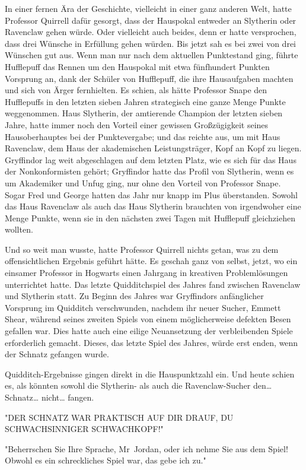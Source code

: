 {In einer fernen Ära der Geschichte, vielleicht in einer ganz anderen Welt, hatte Professor Quirrell dafür gesorgt, dass der Hauspokal entweder an Slytherin oder Ravenclaw gehen würde. Oder vielleicht auch beides, denn er hatte versprochen, dass drei Wünsche in Erfüllung gehen würden. Bis jetzt sah es bei zwei von drei Wünschen gut aus. Wenn man nur nach dem aktuellen Punktestand ging, führte Hufflepuff das Rennen um den Hauspokal mit etwa fünfhundert Punkten Vorsprung an, dank der Schüler von Hufflepuff, die ihre Hausaufgaben machten und sich von Ärger fernhielten. Es schien, als hätte Professor Snape den Hufflepuffs in den letzten sieben Jahren strategisch eine ganze Menge Punkte weggenommen. Haus Slytherin, der amtierende Champion der letzten sieben Jahre, hatte immer noch den Vorteil einer gewissen Großzügigkeit seines Hausoberhauptes bei der Punktevergabe; und das reichte aus, um mit Haus Ravenclaw, dem Haus der akademischen Leistungsträger, Kopf an Kopf zu liegen. Gryffindor lag weit abgeschlagen auf dem letzten Platz, wie es sich für das Haus der Nonkonformisten gehört; Gryffindor hatte das Profil von Slytherin, wenn es um Akademiker und Unfug ging, nur ohne den Vorteil von Professor Snape. Sogar Fred und George hatten das Jahr nur knapp im Plus überstanden. Sowohl das Haus Ravenclaw als auch das Haus Slytherin brauchten von irgendwoher eine Menge Punkte, wenn sie in den nächsten zwei Tagen mit Hufflepuff gleichziehen wollten.

Und so weit man wusste, hatte Professor Quirrell nichts getan, was zu dem offensichtlichen Ergebnis geführt hätte. Es geschah ganz von selbst, jetzt, wo ein einsamer Professor in Hogwarts einen Jahrgang in kreativen Problemlösungen unterrichtet hatte. Das letzte Quidditchspiel des Jahres fand zwischen Ravenclaw und Slytherin statt. Zu Beginn des Jahres war Gryffindors anfänglicher Vorsprung im Quidditch verschwunden, nachdem ihr neuer Sucher, Emmett Shear, während seines zweiten Spiels von einem möglicherweise defekten Besen gefallen war. Dies hatte auch eine eilige Neuansetzung der verbleibenden Spiele erforderlich gemacht. Dieses, das letzte Spiel des Jahres, würde erst enden, wenn der Schnatz gefangen wurde.

Quidditch-Ergebnisse gingen direkt in die Hauspunktzahl ein. Und heute schien es, als könnten sowohl die Slytherin- als auch die Ravenclaw-Sucher den… Schnatz… nicht… fangen.

"DER SCHNATZ WAR PRAKTISCH AUF DIR DRAUF, DU SCHWACHSINNIGER SCHWACHKOPF!"

"Beherrschen Sie Ihre Sprache, Mr~Jordan, oder ich nehme Sie aus dem Spiel! Obwohl es ein schreckliches Spiel war, das gebe ich zu."

}
